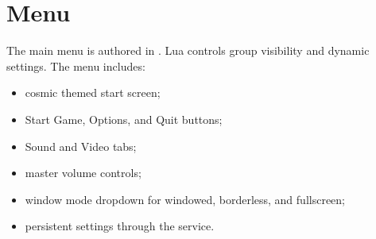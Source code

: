 \section{Menu}

The main menu is authored in . Lua controls group visibility and dynamic settings. The menu includes:

\begin{itemize}
  \item cosmic themed start screen;
  \item Start Game, Options, and Quit buttons;
  \item Sound and Video tabs;
  \item master volume controls;
  \item window mode dropdown for windowed, borderless, and fullscreen;
  \item persistent settings through the  service.
\end{itemize}
